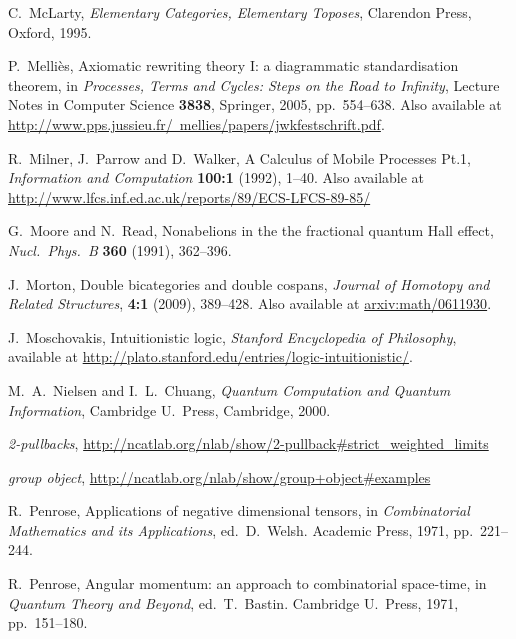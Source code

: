 \documentclass[12pt,twoside,openright]{report}
\begin{document}
\begin{thebibliography}{99}
 C.\ McLarty, {\sl Elementary Categories, Elementary Toposes}, Clarendon Press, Oxford, 1995.

 P.\ Melli\`es, Axiomatic rewriting theory I: a diagrammatic standardisation theorem, in {\sl Processes, Terms and Cycles: Steps on the Road to Infinity}, Lecture Notes in Computer Science {\bf 3838}, Springer, 2005, pp.\ 554--638.  Also available at 
\href{http://www.pps.jussieu.fr/~mellies/papers/jwkfestschrift.pdf}
{http://www.pps.jussieu.fr/~mellies/papers/jwkfestschrift.pdf}.

 R.\ Milner, J.\ Parrow and D.\ Walker, A Calculus of Mobile Processes Pt.1, {\sl Information and Computation} {\bf 100:1} (1992), 1--40. Also available at \href{http://www.lfcs.inf.ed.ac.uk/reports/89/ECS-LFCS-89-85/}{http://www.lfcs.inf.ed.ac.uk/reports/89/ECS-LFCS-89-85/}

 G.\ Moore and N.\ Read, Nonabelions in the the fractional quantum Hall effect, {\sl Nucl.\ Phys.\ B} 
{\bf 360} (1991), 362--396.

 J.\ Morton, Double bicategories and double cospans, \textsl{Journal of Homotopy and Related Structures}, \textbf{4:1} (2009), 389--428.  Also available at \href{http://arxiv.org/abs/math/0611930}{arxiv:math/0611930}.

 J.\ Moschovakis, Intuitionistic logic,
{\sl Stanford Encyclopedia of Philosophy}, available at \hfill \break
\href{http://plato.stanford.edu/entries/logic-intuitionistic/}
{http://plato.stanford.edu/entries/logic-intuitionistic/}.

 M.\ A.\ Nielsen and I.\ L.\ Chuang,
{\sl Quantum Computation and Quantum Information}, Cambridge U.\ 
Press, Cambridge, 2000.

 {\sl 2-pullbacks}, 
\href{http://ncatlab.org/nlab/show/2-pullback#strict_weighted_limits}
{http://ncatlab.org/nlab/show/2-pullback\#strict\_weighted\_limits}

 {\sl group object}, 
\href{http://ncatlab.org/nlab/show/group+object#examples}
{http://ncatlab.org/nlab/show/group+object\#examples}
 
R.\ Penrose, Applications of negative dimensional tensors, in \textsl{Combinatorial Mathematics and its Applications}, ed.\
D.~Welsh. Academic Press, 1971, pp.\ 221--244.

R.\ Penrose, Angular momentum: an approach to combinatorial space-time, in \textsl{Quantum Theory and Beyond}, ed.\
T.~Bastin. Cambridge U.\ Press, 1971, pp.\ 151--180.


\end{thebibliography}
\end{document}
